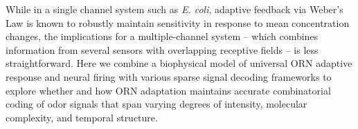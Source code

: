 \documentclass[9pt,twocolumn,twoside,lineno]{pnas-new}
\begin{document}
While in a single channel system such as \textit{E. coli}, adaptive feedback via Weber's Law is known to robustly maintain sensitivity in response to mean concentration changes, the implications for a multiple-channel system -- which combines information from several sensors with overlapping receptive fields  -- is less straightforward. Here we combine a biophysical model of universal ORN adaptive response and neural firing with various sparse signal decoding frameworks to explore whether and how ORN adaptation maintains accurate combinatorial coding of odor signals that span varying degrees of intensity, molecular complexity, and temporal structure. 
\end{document}
